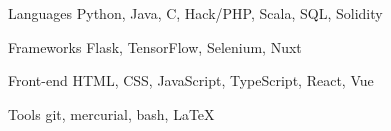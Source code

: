 

\begin{cvskills}


  \cvskill
    {Languages} %
    {Python, Java, C, Hack/PHP, Scala, SQL, Solidity} %

  \cvskill
    {Frameworks} %
    {Flask, TensorFlow, Selenium, Nuxt} %

  \cvskill
    {Front-end} %
    {HTML, CSS, JavaScript, TypeScript, React, Vue} %

  \cvskill
    {Tools} %
    {git, mercurial, bash, \LaTeX} %

\end{cvskills}
